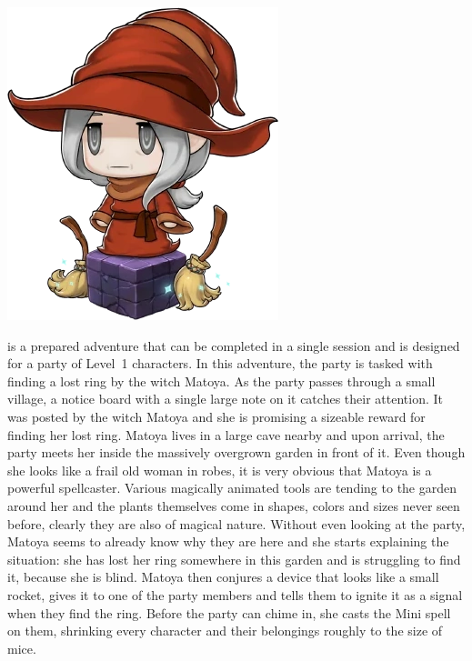 \documentclass[a4paper, titlepage, 11pt, twocolumn] {article}
\begin{document}
%
%
%
\begin{center}
	\includegraphics[width=0.65\columnwidth]{./art/images/matoya.png}
\end{center}
%
 is a prepared adventure that can be completed in a single session and is designed for a party of Level~1 characters.
In this adventure, the party is tasked with finding a lost ring by the witch Matoya.
%
\vfill
%
 As the party passes through a small village, a notice board with a single large note on it catches their attention.
It was posted by the witch Matoya and she is promising a sizeable reward for finding her lost ring.
Matoya lives in a large cave nearby and upon arrival, the party meets her inside the massively overgrown garden in front of it.
Even though she looks like a frail old woman in robes, it is very obvious that Matoya is a powerful spellcaster.
Various magically animated tools are tending to the garden around her and the plants themselves come in shapes, colors and sizes never seen before, clearly they are also of magical nature.
Without even looking at the party, Matoya seems to already know why they are here and she starts explaining the situation:
she has lost her ring somewhere in this garden and is struggling to find it, because she is blind.
Matoya then conjures a device that looks like a small rocket, gives it to one of the party members and tells them to ignite it as a signal when they find the ring.
Before the party can chime in, she casts the Mini spell on them, shrinking every character and their belongings roughly to the size of mice.
\end{document}
